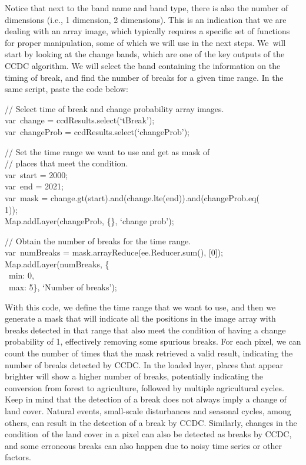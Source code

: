 \documentclass[
  letterpaper,
  DIV=11,
  numbers=noendperiod]{scrreprt}
\begin{document}
Notice that next to the band name and band type, there is also the
number of dimensions (i.e., 1 dimension, 2 dimensions). This is an
indication that we are dealing with an array image, which typically
requires a specific set of functions for proper manipulation, some of
which we will use in the next steps. We~will start by looking at the
change bands, which are one of the key outputs of the CCDC algorithm. We
will select the band containing the information on the timing of break,
and find the number of breaks for a given time range. In the same
script, paste the code below:

// Select time of break and change probability array images.\\
var~change = ccdResults.select(`tBreak');\\
var~changeProb = ccdResults.select(`changeProb');

// Set the time range we want to use and get as mask of\\
// places that meet the condition.\\
var~start = 2000;\\
var~end = 2021;\\
var~mask = change.gt(start).and(change.lte(end)).and(changeProb.eq(\\
1));\\
Map.addLayer(changeProb, \{\}, `change prob');

// Obtain the number of breaks for the time range.\\
var~numBreaks = mask.arrayReduce(ee.Reducer.sum(), {[}0{]});\\
Map.addLayer(numBreaks, \{\\
\hspace*{0.333em} ~min: 0,\\
\hspace*{0.333em} ~max: 5\}, `Number of breaks');

With this code, we define the time range that we want to use, and then
we generate a mask that will indicate all the positions in the image
array with breaks detected in that range that also meet the condition of
having a change probability of 1, effectively removing some spurious
breaks. For each pixel, we can count the number of times that the mask
retrieved a valid result, indicating the number of breaks detected by
CCDC. In the loaded layer, places that appear brighter will show a
higher number of breaks, potentially indicating the conversion from
forest to agriculture, followed by multiple agricultural cycles. Keep in
mind that the detection of a break does not always imply a change of
land cover. Natural events, small-scale disturbances and seasonal
cycles, among others, can result in the detection of a break by CCDC.
Similarly, changes in the condition~of the land cover in a pixel can
also be detected as breaks by CCDC, and some erroneous breaks can also
happen due to noisy time series or other factors.
\end{document}
